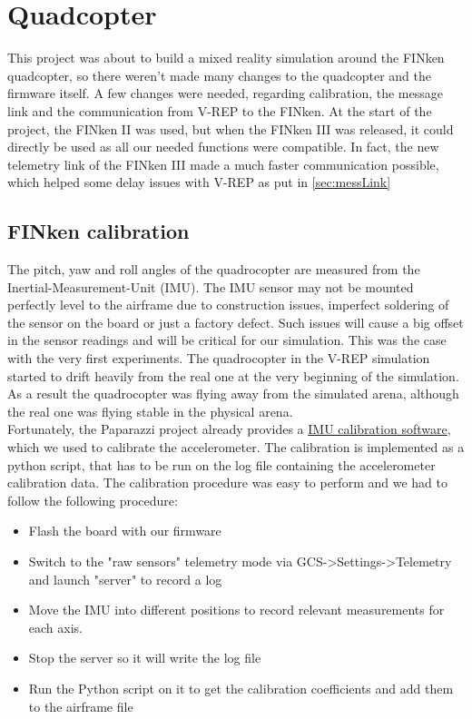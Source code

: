\section{Quadcopter}
\label{sec:finken}
This project was about to build a mixed reality simulation around the FINken quadcopter, so there weren't made many changes to the quadcopter and the firmware itself. A few changes were needed, regarding calibration, the message link and the communication from V-REP to the FINken. At the start of the project, the FINken II was used, but when the FINken III was released, it could directly be used as all our needed functions were compatible. In fact, the new telemetry link of the FINken III made a much faster communication possible, which helped some delay issues with V-REP as put in \ref{sec:messLink}
\subsection{FINken calibration}

The pitch, yaw and roll angles of the quadrocopter are measured from the Inertial-Measurement-Unit (IMU). The IMU sensor may not be mounted perfectly level to the airframe due to construction issues, imperfect soldering of the sensor on the board or just a factory defect. Such issues will cause a big offset in the sensor readings and will be critical for our simulation.
This was the case with the very first experiments. The quadrocopter in the V-REP simulation started to drift heavily from the real one at the very beginning of the simulation. As a result the quadrocopter was flying away from the simulated arena, although the real one was flying stable in the physical arena.\\
Fortunately, the Paparazzi project already provides a \href{http://wiki.paparazziuav.org/wiki/ImuCalibration}{IMU calibration software}, which we used to calibrate the accelerometer. The calibration is implemented as a python script, that has to be run on the log file containing the accelerometer calibration data. The calibration procedure was easy to perform and we had to follow the following procedure:

\begin{itemize}
\item{Flash the board with our firmware}
\item{Switch to the "raw sensors" telemetry mode via GCS->Settings->Telemetry and launch "server" to record a log}
\item{Move the IMU into different positions to record relevant measurements for each axis. }
\item{Stop the server so it will write the log file}
\item{Run the Python script on it to get the calibration coefficients and add them to the airframe file}
\end{itemize}


